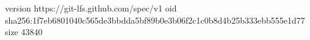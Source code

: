 version https://git-lfs.github.com/spec/v1
oid sha256:1f7eb6801040c565de3bbdda5bf89b0e3b06f2c1c0b8d4b25b333ebb555e1d77
size 43840
